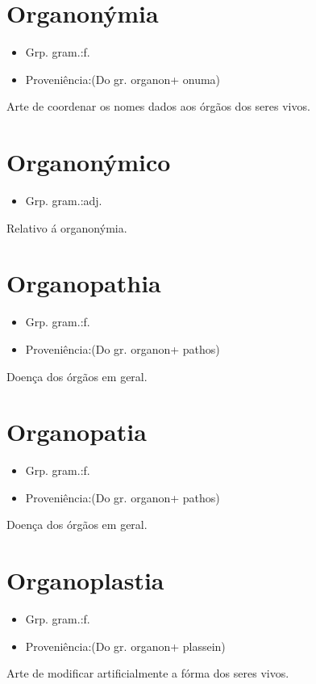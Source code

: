 \section{Organonýmia}
\begin{itemize}
\item {Grp. gram.:f.}
\end{itemize}
\begin{itemize}
\item {Proveniência:(Do gr. \textunderscore organon\textunderscore  + \textunderscore onuma\textunderscore )}
\end{itemize}
Arte de coordenar os nomes dados aos órgãos dos seres vivos.
\section{Organonýmico}
\begin{itemize}
\item {Grp. gram.:adj.}
\end{itemize}
Relativo á organonýmia.
\section{Organopathia}
\begin{itemize}
\item {Grp. gram.:f.}
\end{itemize}
\begin{itemize}
\item {Proveniência:(Do gr. \textunderscore organon\textunderscore  + \textunderscore pathos\textunderscore )}
\end{itemize}
Doença dos órgãos em geral.
\section{Organopatia}
\begin{itemize}
\item {Grp. gram.:f.}
\end{itemize}
\begin{itemize}
\item {Proveniência:(Do gr. \textunderscore organon\textunderscore  + \textunderscore pathos\textunderscore )}
\end{itemize}
Doença dos órgãos em geral.
\section{Organoplastia}
\begin{itemize}
\item {Grp. gram.:f.}
\end{itemize}
\begin{itemize}
\item {Proveniência:(Do gr. \textunderscore organon\textunderscore  + \textunderscore plassein\textunderscore )}
\end{itemize}
Arte de modificar artificialmente a fórma dos seres vivos.
